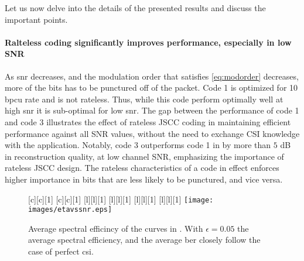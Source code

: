 Let us now delve into the details of the presented results and discuss the important points.




\paragraph*{Ralteless coding significantly improves performance, especially in low SNR} As \gls{snr} decreases, and the modulation order that satisfies \eqref{eq:modorder} decreases, more of the bits has to be punctured off of the  packet. Code 1 is optimized for 10 bpcu rate and is not rateless.  Thus, while this code  perform optimally well at high \gls{snr} it is sub-optimal for low \gls{snr}. The gap between the performance of code 1 and code 3 illustrates the effect of rateless JSCC coding in maintaining efficient performance against all SNR values, without the need to exchange CSI knowledge with the application. Notably,  code 3 outperforms code 1 in  by more than $5$ dB in reconstruction quality, at low channel SNR, emphasizing the importance of rateless JSCC design. The rateless characteristics of a code in effect enforces higher importance in bits that are less likely to be punctured, and vice versa. 

\begin{figure}[t!]
\begin{center}
[c][c][1]{\scalebox{.8}{average spectral efficiency [bpcu]}}
[c][c][1]{\scalebox{.8}{channel signal to noise ratio [dB]}}
[l][l][1]{\scalebox{\textsizescale}{perfect CSI}}
[l][l][1]{\scalebox{\textsizescale}{imperfect CSI, $\epsilon = 0.01$}}
[l][l][1]{\scalebox{\textsizescale}{imperfect CSI, $\epsilon = 0.05$}}
[l][l][1]{\scalebox{\textsizescale}{imperfect CSI, $\epsilon = 0.1$} }
\texttt{[image: images/etavssnr.eps]}
\caption{Average spectral efficincy of the curves in . With $\epsilon = 0.05$ the average spectral efficiency, and the average \gls{ber} closely follow the case of perfect \gls{csi}.}
\label{fig:etavssnr}
\end{center}
\end{figure}

